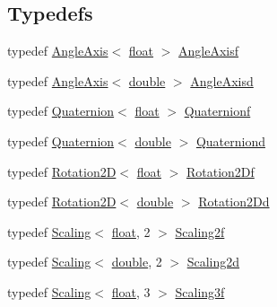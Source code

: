 \subsection*{Typedefs}
\begin{DoxyCompactItemize}
\item 
typedef \hyperlink{class_angle_axis}{Angle\-Axis}$<$ \hyperlink{_super_l_u_support_8h_a6a1bb6ed41f44b60e7bd83b0e9945aa7}{float} $>$ \hyperlink{group___geometry___module_ga811d6fdab2002723bc7a72f055ce8c1d}{Angle\-Axisf}
\item 
typedef \hyperlink{class_angle_axis}{Angle\-Axis}$<$ \hyperlink{_super_l_u_support_8h_a8956b2b9f49bf918deed98379d159ca7}{double} $>$ \hyperlink{group___geometry___module_ga0db1cc067c51aaa6dedf5805ee0c53d7}{Angle\-Axisd}
\item 
typedef \hyperlink{class_quaternion}{Quaternion}$<$ \hyperlink{_super_l_u_support_8h_a6a1bb6ed41f44b60e7bd83b0e9945aa7}{float} $>$ \hyperlink{group___geometry___module_gaf65cf6f803890e57488d7de750bef682}{Quaternionf}
\item 
typedef \hyperlink{class_quaternion}{Quaternion}$<$ \hyperlink{_super_l_u_support_8h_a8956b2b9f49bf918deed98379d159ca7}{double} $>$ \hyperlink{group___geometry___module_ga0d2bd45f1215359f8e7c0d7ab53c4acb}{Quaterniond}
\item 
typedef \hyperlink{class_rotation2_d}{Rotation2\-D}$<$ \hyperlink{_super_l_u_support_8h_a6a1bb6ed41f44b60e7bd83b0e9945aa7}{float} $>$ \hyperlink{group___geometry___module_ga9a907f59280ce5650106a74904bab16d}{Rotation2\-Df}
\item 
typedef \hyperlink{class_rotation2_d}{Rotation2\-D}$<$ \hyperlink{_super_l_u_support_8h_a8956b2b9f49bf918deed98379d159ca7}{double} $>$ \hyperlink{group___geometry___module_ga197b898c965d08135ebfb21bf41b23e2}{Rotation2\-Dd}
\item 
typedef \hyperlink{class_scaling}{Scaling}$<$ \hyperlink{_super_l_u_support_8h_a6a1bb6ed41f44b60e7bd83b0e9945aa7}{float}, 2 $>$ \hyperlink{group___geometry___module_ga6dadc39dddd1468c0f43795bd3b3ddc9}{Scaling2f}
\item 
typedef \hyperlink{class_scaling}{Scaling}$<$ \hyperlink{_super_l_u_support_8h_a8956b2b9f49bf918deed98379d159ca7}{double}, 2 $>$ \hyperlink{group___geometry___module_ga0bd9ad6cbbd04e19839c3099ec4cc2f9}{Scaling2d}
\item 
typedef \hyperlink{class_scaling}{Scaling}$<$ \hyperlink{_super_l_u_support_8h_a6a1bb6ed41f44b60e7bd83b0e9945aa7}{float}, 3 $>$ \hyperlink{group___geometry___module_ga371d61f9b9e65a0c9226df2f84e2b889}{Scaling3f}

\end{DoxyCompactItemize}
